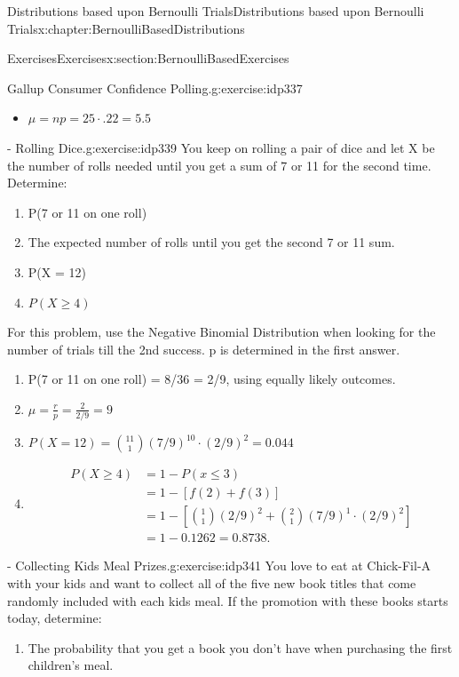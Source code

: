 \documentclass[oneside,10pt,]{book}
\numberwithin{equation}{section}
\begin{document}
\begin{chapterptx}{Distributions based upon Bernoulli Trials}{}{Distributions based upon Bernoulli Trials}{}{}{x:chapter:BernoulliBasedDistributions}
\begin{sectionptx}{Exercises}{}{Exercises}{}{}{x:section:BernoulliBasedExercises}
\begin{inlineexercise}{Gallup Consumer Confidence Polling.}{g:exercise:idp337}
\begin{itemize}[label=\textbullet]
\item{}\(\displaystyle \mu = np = 25 \cdot .22 = 5.5\)%
\end{itemize}
%
\end{inlineexercise}%
\begin{inlineexercise}{- Rolling Dice.}{g:exercise:idp339}%
You keep on rolling a pair of dice and let X be the number of rolls needed until you get a sum of 7 or 11 for the second time. Determine:%
\begin{enumerate}
\item{}P(7 or 11 on one roll)%
\item{}The expected number of rolls until you get the second 7 or 11 sum.%
\item{}P(X = 12)%
\item{}\(\displaystyle P(X \ge 4)\)%
\end{enumerate}
%
\par\smallskip%
\noindent\hypertarget{g:solution:idp340}{}For this problem, use the Negative Binomial Distribution when looking for the number of trials till the 2nd success. p is determined in the first answer.%
\begin{enumerate}
\item{}P(7 or 11 on one roll) = 8\slash{}36 = 2\slash{}9, using equally likely outcomes.%
\item{}\(\displaystyle \mu = \frac{r}{p} = \frac{2}{2/9} = 9\)%
\item{}\(\displaystyle P( X = 12) = \binom{11}{1} (7/9)^10 \cdot (2/9)^2 = 0.044\)%
\item{}%
\begin{align*}
P(X \ge 4) & = 1- P(x \le 3) \\
& = 1 - [ f(2) + f(3) ]\\
& = 1 - \left[ \binom{1}{1} (2/9)^2 + \binom{2}{1} (7/9)^1 \cdot (2/9)^2 \right ]\\
& = 1 - 0.1262 = 0.8738.
\end{align*}
%
\end{enumerate}
%
\end{inlineexercise}%
\begin{inlineexercise}{- Collecting Kids Meal Prizes.}{g:exercise:idp341}%
You love to eat at Chick-Fil-A with your kids and want to collect all of the five new book titles that come randomly included with each kids meal.  If the promotion with these books starts today, determine:%
\begin{enumerate}
\item{}The probability that you get a book you don't have when purchasing the first children's meal.%

\end{enumerate}
\end{inlineexercise}
\end{sectionptx}
\end{chapterptx}
\end{document}
